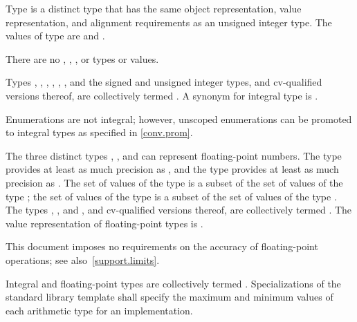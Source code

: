 \pnum
{}%
%
Type  is a distinct type that has
the same object representation,
value representation, and
alignment requirements as
an  unsigned integer type.
The values of type  are
 and .
\begin{note}
There are no , ,
, or  types or values.
\end{note}

\pnum
{}%
Types
,
, ,
, , , and
the signed and unsigned integer types,
and cv-qualified versions thereof,
are collectively termed
.
A synonym for integral type is .
\begin{note}
Enumerations are not integral;
however, unscoped enumerations can be promoted to integral types
as specified in \ref{conv.prom}.
\end{note}

\pnum
{}%
The three distinct types
%
,
%
,
and
%
can represent floating-point numbers.
The type  provides at least as much
precision as , and the type  provides at
least as much precision as . The set of values of the type
 is a subset of the set of values of the type
; the set of values of the type  is a subset
of the set of values of the type .
The types
, , and ,
and cv-qualified versions thereof,
are collectively termed .
The value
representation of floating-point types is .
%
\begin{note}
This document imposes no requirements on the accuracy of
floating-point operations; see also~\ref{support.limits}.
\end{note}
Integral and floating-point types are collectively
termed .
%
Specializations of the standard library template
 shall specify the
maximum and minimum values of each arithmetic type for an
implementation.

